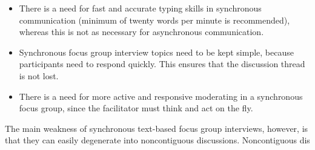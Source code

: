 \documentclass [8pt]{beamer}
\begin{document}
\begin{frame}

 \begin{itemize}
 \item
	There is a need for fast and accurate typing skills in synchronous communication (minimum of twenty words per minute is recommended), whereas this is not as necessary for asynchronous communication.
	\item
	Synchronous focus group interview topics need to be kept simple, because participants need to respond quickly. This ensures that the discussion thread is not
	lost. 
	\item
	There is a need for more active and responsive moderating in a synchronous
	focus group, since the facilitator must think and act on the fly.
 \end{itemize}


The main weakness of synchronous text-based focus group interviews, however, is that they can easily degenerate into noncontiguous discussions. Noncontiguous dis

\end{frame}
\end{document}
